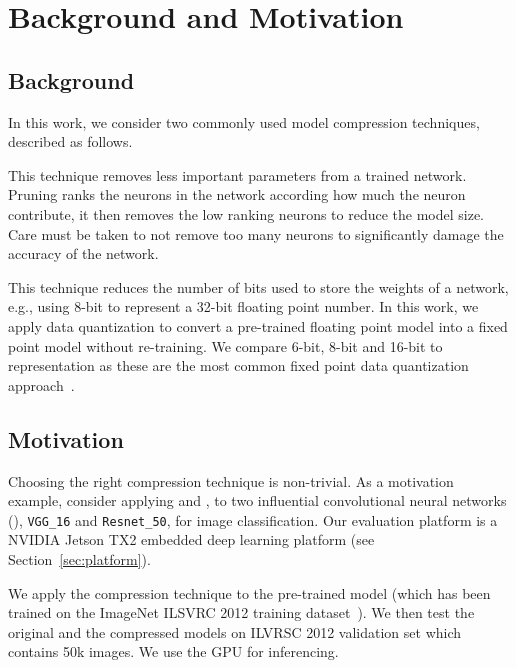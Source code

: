 
\section{Background and Motivation}
\subsection{Background}
In this work, we consider two commonly used model compression techniques, described as follows.

 This technique removes less important parameters from a trained network. Pruning ranks the neurons in the network
according how much the neuron contribute, it then removes the low ranking neurons to reduce the model size. Care must be taken to not
remove too many neurons to significantly damage the accuracy of the network.

 This technique reduces the number of bits used to store the weights of a network, e.g., using 8-bit to
represent a 32-bit floating point number. In this work, we apply data quantization to convert a pre-trained floating point model into a
fixed point model without re-training. We compare 6-bit, 8-bit and 16-bit to representation as these are the most common fixed point data
quantization approach~\cite{pacq}.



\subsection{Motivation}
Choosing the right compression technique is non-trivial. As a motivation example, consider applying \pruning and \dquantization, to two
influential convolutional neural networks (\CNN), \texttt{VGG\_16} 	and \texttt{Resnet\_50}, for image classification. Our evaluation
platform is a NVIDIA Jetson TX2 embedded deep learning platform (see Section~\ref{sec:platform}).

 We apply the compression technique to the pre-trained model (which has been trained on the ImageNet ILSVRC 2012
training dataset~\cite{imagenet2012}). We then test the original and the compressed models on ILVRSC 2012 validation set which contains 50k
images. We use the GPU for inferencing.

